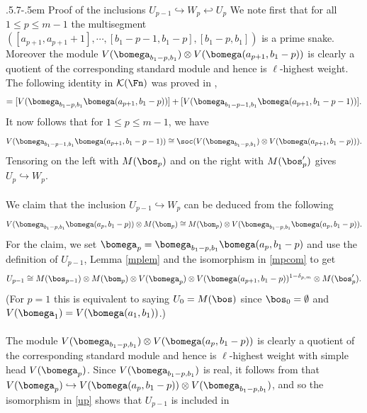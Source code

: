 \documentclass[11pt,reqno]{amsart}
\makeatletter
\theoremstyle{definition} \newtheorem*{defn}{Definition}
\theoremstyle{definition}
\numberwithin{equation}{section}
\def\subsection{\def\@secnumfont{\bfseries}\@startsection{subsection}{2}%
  {\parindent}{.5\linespacing\@plus.7\linespacing}{-.5em}%
  {\normalfont\bfseries}}
\makeatother
\begin{document}
 \subsection{Proof of the inclusions
$U_{p-1}\hookrightarrow W_p\hookleftarrow U_p$} We note first that for all $1\le p\le m-1$ the multisegment $([a_{p+1},a_{p+1}+1],\cdots, [b_1-p-1,b_1-p],[b_1-p,b_1])$ is a prime snake. Moreover  the module $V(\bomega_{b_1-p,b_1})\otimes V(\bomega(a_{p+1}, b_1-p))$ is clearly a quotient of the corresponding standard module and hence is $\ell$-highest weight.   The following identity in $\cal K(\Fn)$ was proved in
 \cite[Proposition 9]{BC25a},
 \begin{gather*}
[V(\bomega_{b_1-p,b_1})][V(\bomega(a_{p+1}, b_1-p))]=    [V(\bomega_{b_1-p,b_1}\bomega(a_{p+1}, b_1-p))]+[V(\bomega_{b_1-p-1,b_1}\bomega(a_{p+1},b_1-p-1))].
 \end{gather*}
 It now follows that   for $1\leq p\leq m-1$, we have
    $$V(\bomega_{b_1-p-1,b_1}\bomega(a_{p+1},b_1-p-1))\cong \soc(V(\bomega_{b_1-p,b_1})\otimes V(\bomega(a_{p+1},b_1-p))).$$ Tensoring on the left with $M(\bos_p)$ and on the right with $M(\bos'_p)$ gives $U_p\hookrightarrow W_p$.\\\\
    We claim  that the inclusion $U_{p-1}\hookrightarrow W_p$ can be deduced from the following
\begin{equation} \label{mpcom}V(\bomega_{b_1-p,b_1}\bomega(a_p,b_1-p))\otimes M(\bom_p)\cong M(\bom_p)\otimes  V(\bomega_{b_1-p,b_1}\bomega(a_p,b_1-p)).\end{equation}
For the claim, we set $\bomega_p= \bomega_{b_1-p,b_1}\bomega(a_p, b_1-p)$ and use  the definition of $U_{p-1}$, Lemma \ref{mplem} and the isomorphism in \eqref{mpcom} to get
\begin{gather}\label{up} U_{p-1}\cong M(\bos_{p-1})\otimes M(\bom_p)\otimes V(\bomega_p)\otimes V(\bomega(a_{p+1},b_1-p))^{1-\delta_{p,m}}\otimes M(\bos'_p).\end{gather}
(For $p=1$ this is equivalent to saying $U_0=M(\bos)$ since $\bos_0=\emptyset$ and $V(\bomega_1)=V(\bomega(a_1,b_1))$.) \\\\
The module $V(\bomega_{b_1-p,b_1})\otimes V(\bomega(a_p,b_1-p))$ is clearly a quotient of the corresponding standard module and hence is $\ell$-highest weight with simple head $V(\bomega_p)$. Since $V(\bomega_{b_1-p,b_1})$ is real, it follows from \cite[Theorem 3.12]{KKKO15} that
$V(\bomega_p)\hookrightarrow V(\bomega(a_p,b_1-p))\otimes V(\bomega_{b_1-p,b_1})$, and so  the isomorphism in \eqref{up} shows that $U_{p-1}$ is included in
\end{document}
